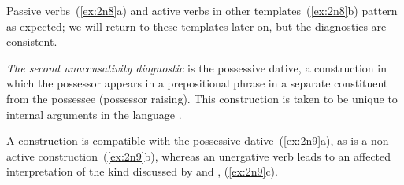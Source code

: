\begin{exe}
\begin{xlist}
\begin{exe}
\begin{xlist}
\begin{exe}
\begin{xlist}
\begin{exe}
\begin{exe}
\begin{xlist}
\begin{exe}
\begin{xlist}
 \begin{exe}\judgewidth{\#}
 \ex  \label{ex:2n7}
 \begin{xlist} 
	
	
 \z
\z 

Passive verbs~(\ref{ex:2n8}a) and active verbs in other templates~(\ref{ex:2n8}b) pattern as expected; we will return to these templates later on, but the diagnostics are consistent.
 \begin{exe}\judgewidth{\#}
 \ex  \label{ex:2n8}
 \begin{xlist} 
	
	
 \z
\z 

\textit{The second unaccusativity diagnostic} is the possessive dative, a construction in which the possessor appears in a prepositional phrase in a separate constituent from the possessee (possessor raising). This construction is taken to be unique to internal arguments in the language \citep{borergrodzinsky86,borer98csli}.

A  construction is compatible with the possessive dative~(\ref{ex:2n9}a), as is a non-active construction~(\ref{ex:2n9}b), whereas an unergative verb leads to an affected interpretation of the kind discussed by \cite{arieletal15} and \cite{barashersiegalboneh16}, (\ref{ex:2n9}c). 


\end{xlist}
\end{exe}
\end{xlist}
\end{exe}
\end{xlist}
\end{exe}
\end{xlist}
\end{exe}
\end{exe}
\end{xlist}
\end{exe}
\end{xlist}
\end{exe}
\end{xlist}
\end{exe}
